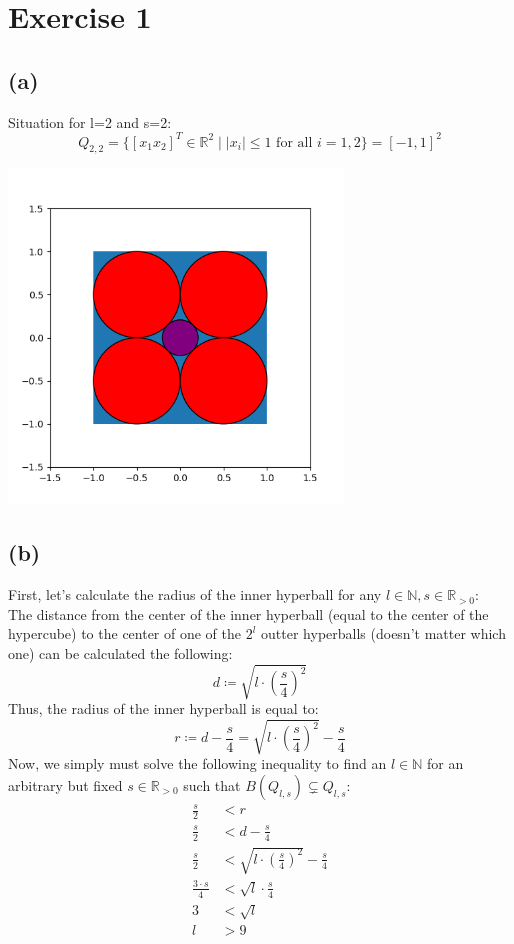 \documentclass[12pt]{article}
\begin{document}
\section*{Exercise 1}
\subsection*{(a)}
Situation for l=2 and s=2:
\[Q_{2,2}=\lbrace [x_1 x_2]^T\in\mathbb{R}^2\mid |x_i|\leq 1 \text{ for all } i=1,2\rbrace = [-1,1]^2\]
\begin{center}
	\includegraphics[width=3.5in]{code/exercise_01_a.png}
\end{center}

\subsection*{(b)}
First, let's calculate the radius of the inner hyperball for any $l \in \mathbb{N}, s \in \mathbb{R}_{>0}$: \\
The distance from the center of the inner hyperball (equal to the center of the hypercube) to the center of one of the $2^l$ outter hyperballs (doesn't matter which one) can be calculated the following:
\begin{equation*}
	d \coloneqq \sqrt{l \cdot \left( \frac{s}{4} \right)^2}
\end{equation*}
Thus, the radius of the inner hyperball is equal to:
\begin{equation*}
	r \coloneqq d - \frac{s}{4} = \sqrt{l \cdot \left( \frac{s}{4} \right)^2} - \frac{s}{4}
\end{equation*}
Now, we simply must solve the following inequality to find an $l \in \mathbb{N}$ for an arbitrary but fixed $s \in \mathbb{R}_{>0}$ such that $B(Q_{l,s}) \subsetneq Q_{l,s}$:
\begin{align*}
	\frac{s}{2} &< r \\
	\frac{s}{2} &< d - \frac{s}{4} \\
	\frac{s}{2} &< \sqrt{l \cdot \left( \frac{s}{4} \right)^2} - \frac{s}{4} \\
	\frac{3 \cdot s}{4} &< \sqrt{l} \cdot \frac{s}{4} \\
	3 &< \sqrt{l} \\
	l &> 9
\end{align*}
\end{document}
